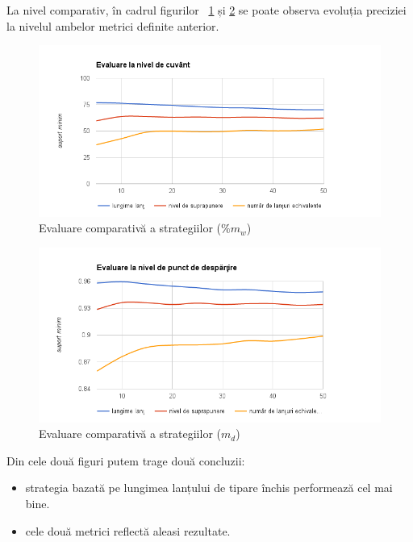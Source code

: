 La nivel comparativ, în cadrul figurilor ~\ref{fig:strategies-word} și \ref{fig:strategies-point} se poate observa evoluția preciziei la nivelul ambelor metrici definite anterior. 


\begin{figure}[h!]
    \centering
    \includegraphics[width=1\textwidth]{figures/strategies-word.png}
    \caption{Evaluare comparativă a strategiilor ($\%m_w$)}
    \label{fig:strategies-word}
\end{figure}


\begin{figure}[h!]
    \centering
    \includegraphics[width=1\textwidth]{figures/strategies-point.png}
    \caption{Evaluare comparativă a strategiilor ($m_d$)}
    \label{fig:strategies-point}
\end{figure}

Din cele două figuri putem trage două concluzii:

\begin{itemize}
\item strategia bazată pe lungimea lanțului de tipare închis performează cel mai bine. 
\item cele două metrici reflectă aleasi rezultate. 
\end{itemize}

